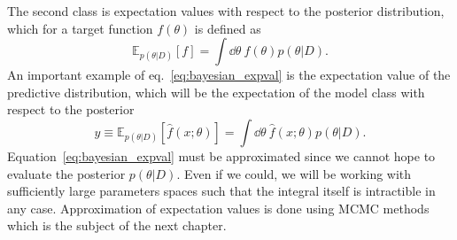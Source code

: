 The second class is expectation values with respect to the posterior distribution, which
for a target function $f(\theta)$ is defined as
\begin{equation}\label{eq:bayesian_expval}
    \mathbb{E}_{p(\theta|D)}[f] = \int \dd\theta \ f(\theta)p(\theta|D).
\end{equation}
An important example of eq.~\eqref{eq:bayesian_expval} is the expectation value
of the predictive distribution, which will be the expectation of the model class 
with respect to the posterior
\begin{equation}
    \hat{y} \equiv \mathbb{E}_{p(\theta|D)}[\hat{f}(x;\theta)] = \int \dd\theta \ \hat{f}(x;\theta)p(\theta|D).
\end{equation}
Equation~\eqref{eq:bayesian_expval} must be approximated since we cannot hope to evaluate the posterior $p(\theta|D)$.
Even if we could, we will be working with sufficiently large parameters spaces such that the integral itself
is intractible in any case. Approximation of expectation values is done using MCMC methods 
which is the subject of the next chapter.